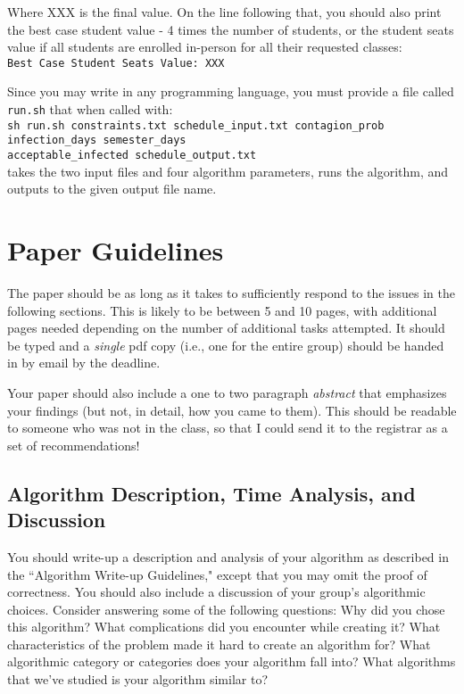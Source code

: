 \documentclass[12pt]{article}
\begin{document}
\noindent Where XXX is the final value. On the line following that, you should also print the best case student value - 4 times the number of students, or the student seats value if all students are enrolled in-person for all their requested classes:\\
\texttt{Best Case Student Seats Value: XXX}

Since you may write in any programming language, you must provide a file called \texttt{run.sh} that when called with: \\\texttt{sh run.sh constraints.txt schedule\_input.txt contagion\_prob infection\_days semester\_days}\\
\indent\indent\texttt{acceptable\_infected schedule\_output.txt}\\
 takes the two input files and four algorithm parameters, runs the algorithm, and outputs to the given output file name.

\section{Paper Guidelines}
The paper should be as long as it takes to sufficiently respond to the issues in the following sections. This is likely to be between 5 and 10 pages, with additional pages needed depending on the number of additional tasks attempted. It should be typed and a \emph{single} pdf copy (i.e., one for the entire group) should be handed in by email by the deadline.

Your paper should also include a one to two paragraph \emph{abstract} that emphasizes your findings (but not, in detail, how you came to them).  This should be readable to someone who was not in the class, so that I could send it to the registrar as a set of recommendations!

\subsection{Algorithm Description, Time Analysis, and Discussion}
\label{theory_analysis}
You should write-up a description and analysis of your algorithm as described in the ``Algorithm Write-up Guidelines," except that you may omit the proof of correctness. You should also include a discussion of your group's algorithmic choices. Consider answering some of the following questions: Why did you chose this algorithm? What complications did you encounter while creating it? What characteristics of the problem made it hard to create an algorithm for? What algorithmic category or categories does your algorithm fall into? What algorithms that we've studied is your algorithm similar to?
\end{document}
